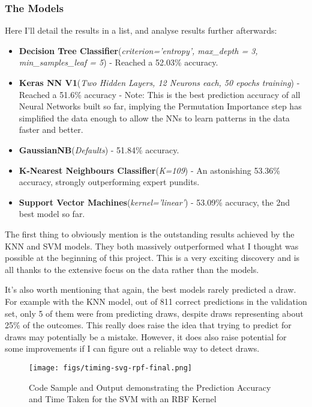 \documentclass[12pt,a4paper,twoside,openright]{report}
\begin{document}
\subsubsection{The Models}

Here I'll detail the results in a list, and analyse results further afterwards:

\begin{itemize}
    \item 
    {
    \textbf{Decision Tree Classifier}(\textit{criterion='entropy', max\_depth = 3, min\_samples\_leaf = 5}) - Reached a 52.03\% accuracy.
    }
    \item 
    {
    \textbf{Keras NN V1}(\textit{Two Hidden Layers, 12 Neurons each, 50 epochs training}) - Reached a 51.6\% accuracy - Note: This is the best prediction accuracy of all Neural Networks built so far, implying the Permutation Importance step has simplified the data enough to allow the NNs to learn patterns in the data faster and better.
    }
    \item
    {
    \textbf{GaussianNB}(\textit{Defaults}) - 51.84\% accuracy.
    }
    \item
    {
    \textbf{K-Nearest Neighbours Classifier}(\textit{K=109}) - An astonishing 53.36\% accuracy, strongly outperforming expert pundits.
    }
    \item
    {
    \textbf{Support Vector Machines}(\textit{kernel='linear'}) - 53.09\% accuracy, the 2nd best model so far.
    }
\end{itemize}

The first thing to obviously mention is the outstanding results achieved by the KNN and SVM models. They both massively outperformed what I thought was possible at the beginning of this project. This is a very exciting discovery and is all thanks to the extensive focus on the data rather than the models.

It's also worth mentioning that again, the best models rarely predicted a draw. For example with the KNN model, out of 811 correct predictions in the validation set, only 5 of them were from predicting draws, despite draws representing about 25\% of the outcomes. This really does raise the idea that trying to predict for draws may potentially be a mistake. However, it does also raise potential for some improvements if I can figure out a reliable way to detect draws.

\begin{figure}[h]
  \centering
  \texttt{[image: figs/timing-svg-rpf-final.png]}
  \caption{Code Sample and Output demonstrating the Prediction Accuracy and Time Taken for the SVM with an RBF Kernel}
  \label{fig:timing-svg-rbf-final}
\end{figure}
\end{document}
